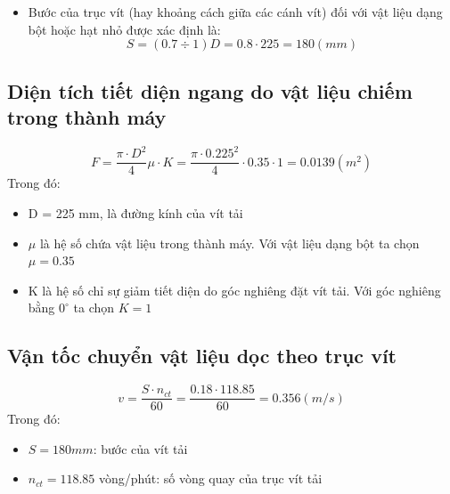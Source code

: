 \begin{itemize}
    \item Bước của trục vít (hay khoảng cách giữa các cánh vít) đối với vật liệu dạng bột hoặc hạt nhỏ được xác định là:
    \[
        S = (0.7 \div 1)D = 0.8 \cdot 225 = 180 (mm) 
    \]
\end{itemize}
\subsection{Diện tích tiết diện ngang do vật liệu chiếm trong thành máy}
\[
    F = \frac{\pi\cdot D^2}{4}\mu \cdot K = \frac{\pi\cdot 0.225^2}{4}\cdot 0.35\cdot 1 = 0.0139 (m^2)
\]
Trong đó: 
\begin{itemize}
    \item D = 225 mm, là đường kính của vít tải
    \item $\mu$ là hệ số chứa vật liệu trong thành máy. Với vật liệu dạng bột ta chọn $\mu = 0.35$
    \item K là hệ số chỉ sự giảm tiết diện do góc nghiêng đặt vít tải. Với góc nghiêng bằng $0^{\circ}$ ta chọn $K = 1$
\end{itemize}
\subsection{Vận tốc chuyển vật liệu dọc theo trục vít}
\[
    v = \frac{S\cdot n_{ct}}{60} = \frac{0.18\cdot 118.85}{60} = 0.356 (m/s)
\]
Trong đó: 
\begin{itemize}
    \item $S = 180 mm$: bước của vít tải
    \item $n_{ct} = 118.85$ vòng/phút: số vòng quay của trục vít tải
\end{itemize}
